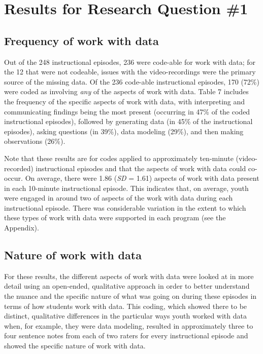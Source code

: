 \documentclass[]{book}
\theoremstyle{definition}
\theoremstyle{definition}
\theoremstyle{definition}
\theoremstyle{remark}
\begin{document}
\section{Results for Research Question
\#1}\label{results-for-research-question-1}

\subsection{Frequency of work with
data}\label{frequency-of-work-with-data}

Out of the 248 instructional episodes, 236 were code-able for work with
data; for the 12 that were not codeable, issues with the
video-recordings were the primary source of the missing data. Of the 236
code-able instructional episodes, 170 (72\%) were coded as involving
\emph{any} of the aspects of work with data. Table 7 includes the
frequency of the specific aspects of work with data, with interpreting
and communicating findings being the most present (occurring in 47\% of
the coded instructional episodes), followed by generating data (in 45\%
of the instructional episodes), asking questions (in 39\%), data
modeling (29\%), and then making observations (26\%).

Note that these results are for codes applied to approximately
ten-minute (video-recorded) instructional episodes and that the aspects
of work with data could co-occur. On average, there were 1.86 (\emph{SD}
= 1.61) aspects of work with data present in each 10-minute
instructional episode. This indicates that, on average, youth were
engaged in around two of aspects of the work with data during each
instructional episode. There was considerable variation in the extent to
which these types of work with data were supported in each program (see
the Appendix).

\subsection{Nature of work with data}\label{nature-of-work-with-data}

For these results, the different aspects of work with data were looked
at in more detail using an open-ended, qualitative approach in order to
better understand the nuance and the specific nature of what was going
on during these episodes in terms of how students work with data. This
coding, which showed there to be distinct, qualitative differences in
the particular ways youth worked with data when, for example, they were
data modeling, resulted in approximately three to four sentence notes
from each of two raters for every instructional episode and showed the
specific nature of work with data.
\end{document}
